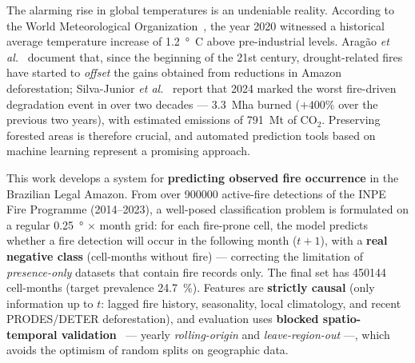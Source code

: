 \documentclass[tcc2]{uftex}
\begin{document}
  \begin{foreignabstract}
The alarming rise in global temperatures is an undeniable reality. According to the World Meteorological Organization~\cite{wmo2021}, the year 2020 witnessed a historical average temperature increase of \SI{1.2}{\degree C} above pre-industrial levels. Aragão \emph{et al.}~\cite{aragao2018amazon} document that, since the beginning of the 21st century, drought-related fires have started to \emph{offset} the gains obtained from reductions in Amazon deforestation; Silva-Junior \emph{et al.}~\cite{silvajunior2025amazon} report that 2024 marked the worst fire-driven degradation event in over two decades --- \SI{3.3}{\mega\hectare} burned (\(+400\%\) over the previous two years), with estimated emissions of \SI{791}{\mega\tonne} of CO$_{2}$. Preserving forested areas is therefore crucial, and automated prediction tools based on machine learning represent a promising approach.

This work develops a system for \textbf{predicting observed fire occurrence} in the Brazilian Legal Amazon. From over \num{900000} active-fire detections of the INPE Fire Programme (2014--2023), a well-posed classification problem is formulated on a regular \SI{0.25}{\degree} $\times$ month grid: for each fire-prone cell, the model predicts whether a fire detection will occur in the following month (\(t+1\)), with a \textbf{real negative class} (cell-months without fire) --- correcting the limitation of \emph{presence-only} datasets that contain fire records only. The final set has \num{450144} cell-months (target prevalence \SI{24.7}{\percent}). Features are \textbf{strictly causal} (only information up to \(t\): lagged fire history, seasonality, local climatology, and recent PRODES/DETER deforestation), and evaluation uses \textbf{blocked spatio-temporal validation}~\cite{roberts2017cv} --- yearly \emph{rolling-origin} and \emph{leave-region-out} ---, which avoids the optimism of random splits on geographic data.


\end{foreignabstract}
\end{document}
